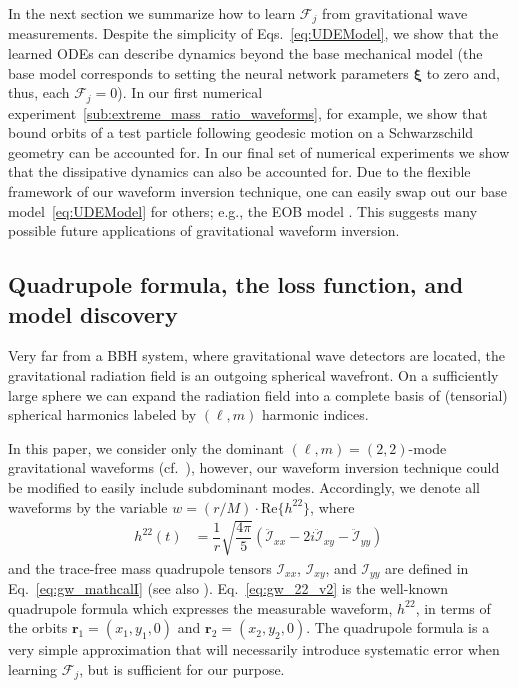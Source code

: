 \documentclass[ reprint,
nofootinbib,
 amsmath,amssymb,
 aps,
]{revtex4-2}
\begin{document}
In the next section
we summarize how to learn $\mathcal{F}_j$ from gravitational wave measurements.
Despite the simplicity of Eqs.~\eqref{eq:UDEModel}, we show that the learned ODEs can describe dynamics beyond the base mechanical model (the base model corresponds to setting the neural network parameters $\bm{\xi}$ to zero and, thus, each $\mathcal{F}_j = 0$). In our first numerical experiment~\ref{sub:extreme_mass_ratio_waveforms}, for example, we show that bound orbits of a test particle following geodesic motion on a Schwarzschild geometry can be accounted for. In our final set of numerical experiments we show that the dissipative dynamics can also be accounted for. Due to the flexible framework of our waveform inversion technique, 
one can easily swap out our base model~\eqref{eq:UDEModel} for others; e.g., the EOB model \cite{buonanno1999effective}.
This suggests many possible future applications of gravitational waveform inversion.



\subsection{Quadrupole formula, the loss function, and model discovery} \label{sec:model_discovery}

Very far from a BBH system, where gravitational wave detectors are located, the gravitational radiation 
field is an outgoing spherical wavefront. On a sufficiently large sphere we can expand the radiation field
into a complete basis of (tensorial) spherical harmonics labeled by $(\ell, m)$ harmonic indices. 

In this paper, we consider only the dominant $(\ell, m)=(2,2)$-mode gravitational waveforms (cf.~), however, our waveform inversion technique could be modified to easily include subdominant modes.
Accordingly, we denote all waveforms by the variable $w = (r/M)\cdot\mathrm{Re}\{h^{22}\}$, where
\begin{align}
\label{eq:gw_22_v2}
h^{22}(t) &=\dfrac{1}{r}\sqrt{\dfrac{4\pi}{5}}\left(\ddot{\mathcal{I}}_{xx}
- 2 i\ddot{\mathcal{I}}_{xy}-\ddot{\mathcal{I}}_{yy}\right)\,
\end{align}
and the trace-free mass quadrupole tensors $\mathcal{I}_{xx}$, $\mathcal{I}_{xy}$, and $\mathcal{I}_{yy}$ are defined in Eq.~\cref{eq:gw_mathcalI} (see also \cite[Eqs.~54--56]{bishop2016extraction}). Eq.~\eqref{eq:gw_22_v2} is the well-known quadrupole formula which 
expresses the measurable waveform, $h^{22}$, in terms of the orbits $\mathbf{r}_1 = (x_1,y_1,0)$ and $\mathbf{r}_2 = (x_2,y_2,0)$. The quadrupole formula
is a very simple approximation that will necessarily introduce systematic error when learning $\mathcal{F}_j$, but 
is sufficient for our purpose. 
\end{document}

